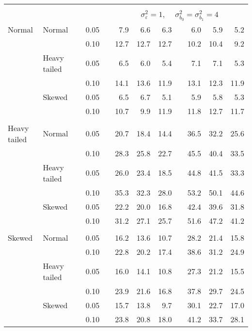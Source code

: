 \begin{table}[ht]
\begin{scriptsize}
\begin{tabular}{ll p{.1cm} c p{.1cm} rrr p{.1cm} rrr}
&&&&&&&&&&&\\
& && && \multicolumn{7}{c}{$\sigma_{\varepsilon}^2 = 1$, \ \ $\sigma_{b_0}^2 = \sigma_{b_1}^2 = 4$} \\ \cline{6-12}
\rowcolor{gray!20} Normal & Normal &  & 0.05 &  & 7.9 & 6.6 & 6.3 &  & 6.0 & 5.9 & 5.2 \\ 
\rowcolor{gray!20}    &  &  & 0.10 &  & 12.7 & 12.7 & 12.7 &  & 10.2 & 10.4 & 9.2 \\ 
\rowcolor{gray!20}    & Heavy tailed &  & 0.05 &  & 6.5 & 6.0 & 5.4 &  & 7.1 & 7.1 & 5.3 \\ 
\rowcolor{gray!20}    &  &  & 0.10 &  & 14.1 & 13.6 & 11.9 &  & 13.1 & 12.3 & 11.9 \\ 
\rowcolor{gray!20}    & Skewed &  & 0.05 &  & 6.5 & 6.7 & 5.1 &  & 5.9 & 5.8 & 5.3 \\ 
\rowcolor{gray!20}    &  &  & 0.10 &  & 10.7 & 9.9 & 11.9 &  & 11.8 & 12.7 & 11.7 \\ 
&&&&&&&&&&&\\
  Heavy tailed & Normal &  & 0.05 &  & 20.7 & 18.4 & 14.4 &  & 36.5 & 32.2 & 25.6 \\ 
   &  &  & 0.10 &  & 28.3 & 25.8 & 22.7 &  & 45.5 & 40.4 & 33.5 \\ 
   & Heavy tailed &  & 0.05 &  & 26.0 & 23.4 & 18.5 &  & 44.8 & 41.5 & 33.3 \\ 
   & &  & 0.10 &  & 35.3 & 32.3 & 28.0 &  & 53.2 & 50.1 & 44.6 \\ 
   & Skewed &  & 0.05 &  & 22.2 & 20.0 & 16.8 &  & 42.4 & 39.6 & 31.8 \\ 
   &  &  & 0.10 &  & 31.2 & 27.1 & 25.7 &  & 51.6 & 47.2 & 41.2 \\ 
&&&&&&&&&&&\\
  Skewed & Normal &  & 0.05 &  & 16.2 & 13.6 & 10.7 &  & 28.2 & 21.4 & 15.8 \\ 
   &  &  & 0.10 &  & 22.8 & 20.2 & 17.4 &  & 38.6 & 31.2 & 24.9 \\ 
   & Heavy tailed &  & 0.05 &  & 16.0 & 14.1 & 10.8 &  & 27.3 & 21.2 & 15.5 \\ 
   &  &  & 0.10 &  & 23.9 & 21.6 & 16.8 &  & 37.8 & 29.7 & 24.5 \\ 
   & Skewed &  & 0.05 &  & 15.7 & 13.8 & 9.7 &  & 30.1 & 22.7 & 17.0 \\ 
   &  &  & 0.10 &  & 23.8 & 20.8 & 18.0 &  & 41.2 & 33.7 & 28.1 \\ 

\hline
\end{tabular}
\end{scriptsize}
\end{table}



